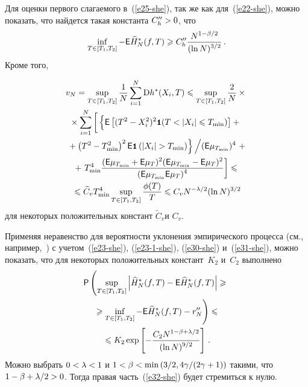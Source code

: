 \begin{multicols}{2}
Для оценки первого слагаемого в~(\ref{e25-she}), так же как для~(\ref{e22-she}), 
можно показать, что найдется такая константа $C''_h\hm>0$, что
\begin{equation}
\inf\limits_{T\in[T_1,T_2]}-{\sf E}\widehat{H}^{*}_N(f,T)\geqslant C''_h\displaystyle\frac{\displaystyle N^{1-\beta/2}\mathstrut}{\displaystyle (\ln N)^{3/2}\mathstrut}\,.\label{e30-she}
\end{equation}
Кроме того,


\noindent
\begin{multline}
v_N=\sup\limits_{T\in[T_1,T_2]}\fr{1}{N}\sum\limits_{i=1}^{N}\mathrm{D}h^*(X_i,T)
\leqslant\sup\limits_{T\in[T_1,T_2]}\fr{2}{N}\times{}\\
{}\times\sum\limits_{i=1}^{N}\left[ 
\vphantom{\fr{({\sf E}\mu_{T_{\min}}+{\sf E}\mu_{T})^2({\sf E}\mu_{T_{\min}}-{\sf E}\mu_{T})^2}
{({\sf E}\mu_{T_{\min}}{\sf E}\mu_{T})^4}}
\left\{ \vphantom{\left(T^2-T_{\min}^2\right)^2{\sf E}\Ik\left(\abs{X_i}>T_{\min}\right)}
{\sf E}\left[(T^2-X_i^2)^2\Ik(T<\abs{X_i}
\leqslant T_{\min})\right]+{}\right.\right.\\
\left.\left.{}+\left(T^2-T_{\min}^2\right)^2{\sf E}\Ik\left(\abs{X_i}>T_{\min}\right)\right\}\Big /
({\sf E}\mu_{T_{\min}})^4\right.+{}\\
{}+\left.T_{\min}^{4}\fr{({\sf E}\mu_{T_{\min}}+{\sf E}\mu_{T})^2({\sf E}\mu_{T_{\min}}-{\sf E}\mu_{T})^2}
{({\sf E}\mu_{T_{\min}}{\sf E}\mu_{T})^4}\right]\leqslant{}\\
{}\leqslant\widetilde{C}_v T_{\min}^{4}\sup\limits_{T\in[T_1,T_2]}
\fr{\phi(T)}{T}\leqslant C_v N^{-\lambda/2}(\ln N)^{3/2}\label{e31-she}
\end{multline}
для некоторых положительных констант $\widetilde{C}_v$\linebreak и $C_v$.


Применяя неравенство для вероятности уклонения эмпирического процесса (см., например,~\cite{18-she, 21-she, 23-she}) 
с учетом~(\ref{e23-she}), (\ref{e23-1-she}), (\ref{e30-she}) и~(\ref{e31-she}), можно показать, что для некоторых положительных 
констант~$K_2$ и~$C_2$ выполнено
\begin{multline}
{\sf P}\left(\sup\limits_{T\in[T_1,T_2]}\abs{\widehat{H}^{*}_N(f,T)-{\sf E}\widehat{H}^{*}_N(f,T)}
\geqslant{}\right.\\
\left.{}\geqslant\inf\limits_{T\in[T_1,T_2]}-{\sf E}\widehat{H}^{*}_N(f,T)-r''_N
\vphantom{\sup\limits_{T\in[T_1,T_2]}}\right)\leqslant{}\\
{}\leqslant K_2\exp\left[-\fr{C_2 N^{1-\beta+\lambda/2}}{(\ln N)^{9/2}}\right]\,.\label{e32-she}
\end{multline}
Можно выбрать $0<\lambda\hm<1$ и $1\hm<\beta\hm<\min\left({3}/{2},{4\gamma}/(2\gamma+1)\right)$ такими, что $1\hm-\beta\hm+\lambda/2\hm>0$. 
Тогда правая часть~(\ref{e32-she}) будет стремиться к нулю.


\end{multicols}
